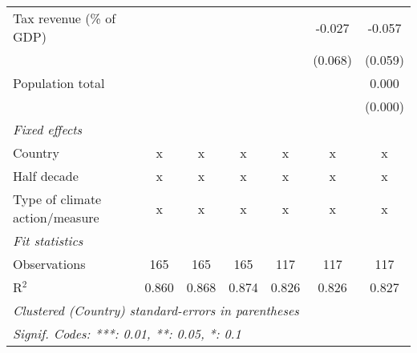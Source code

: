\begin{tabular}{lcccccc}
   Tax revenue (\% of GDP)                                               &         &                &                &                & -0.027         & -0.057\\   
                                                                         &         &                &                &                & (0.068)        & (0.059)\\   
   Population total                                                      &         &                &                &                &                & 0.000\\   
                                                                         &         &                &                &                &                & (0.000)\\   
   \emph{Fixed effects}\\
   Country                                                               & x       & x              & x              & x              & x              & x\\  
   Half decade                                                           & x       & x              & x              & x              & x              & x\\  
   Type of climate action/measure                                        & x       & x              & x              & x              & x              & x\\  
   \midrule \emph{Fit statistics}\\
   Observations                                                          & 165     & 165            & 165            & 117            & 117            & 117\\  
   R$^2$                                                                 & 0.860   & 0.868          & 0.874          & 0.826          & 0.826          & 0.827\\  
   \midrule
   \multicolumn{7}{l}{\emph{Clustered (Country) standard-errors in parentheses}}\\
   \multicolumn{7}{l}{\emph{Signif. Codes: ***: 0.01, **: 0.05, *: 0.1}}\\
\end{tabular}
\par\endgroup


